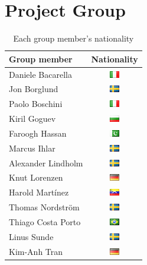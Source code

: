 \section{Project Group}

\begin{table}
\centering
\begin{tabular}{|l|c|}
\hline
Group member & Nationality \\ \hline\hline
Daniele Bacarella & \includegraphics{graphics/it} \\
Jon Borglund & \includegraphics{graphics/se} \\
Paolo Boschini & \includegraphics{graphics/it} \\
Kiril Goguev & \includegraphics{graphics/bg} \\
Faroogh Hassan & \includegraphics{graphics/pk} \\
Marcus Ihlar & \includegraphics{graphics/se} \\
Alexander Lindholm & \includegraphics{graphics/se} \\
Knut Lorenzen & \includegraphics{graphics/de} \\
Harold Mart\'{i}nez & \includegraphics{graphics/ve} \\
Thomas Nordstr\"om & \includegraphics{graphics/se} \\
Thiago Costa Porto & \includegraphics{graphics/br} \\
Linus Sunde & \includegraphics{graphics/se} \\
Kim-Anh Tran & \includegraphics{graphics/de} \\
\hline
\end{tabular}
\caption{Each group member's nationality}\label{fig:nationality}
\end{table}

